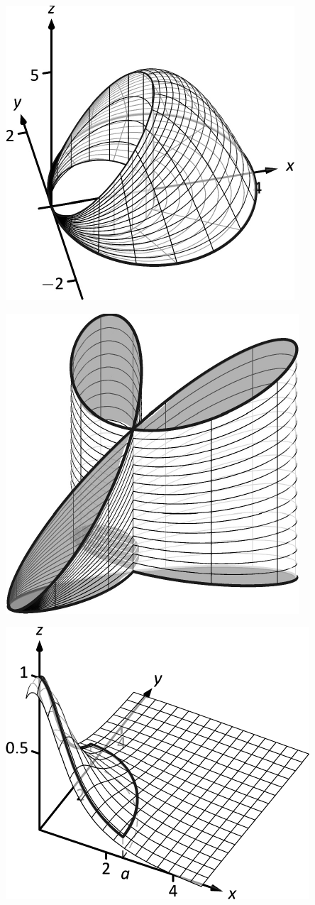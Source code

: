 \documentclass[10pt]{article}
\begin{document}
\includegraphics{figdoublepol2b_3DBW.pdf}
\texttt{}

\includegraphics{figdoublepol4_3DBW.pdf}
\texttt{}

\includegraphics{figdoublepol5_3DBW.pdf}
\texttt{}
\end{document}
